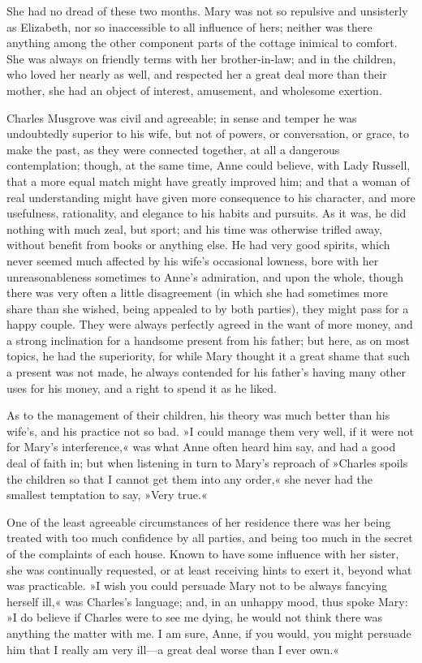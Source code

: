 She had no dread of these two months. Mary was not so repulsive and unsisterly as Elizabeth, nor so inaccessible to all influence of hers; neither was there anything among the other component parts of the cottage inimical to comfort. She was always on friendly terms with her brother-in-law; and in the children, who loved her nearly as well, and respected her a great deal more than their mother, she had an object of interest, amusement, and wholesome exertion.

Charles Musgrove was civil and agreeable; in sense and temper he was undoubtedly superior to his wife, but not of powers, or conversation, or grace, to make the past, as they were connected together, at all a dangerous contemplation; though, at the same time, Anne could believe, with Lady Russell, that a more equal match might have greatly improved him; and that a woman of real understanding might have given more consequence to his character, and more usefulness, rationality, and elegance to his habits and pursuits. As it was, he did nothing with much zeal, but sport; and his time was otherwise trifled away, without benefit from books or anything else. He had very good spirits, which never seemed much affected by his wife's occasional lowness, bore with her unreasonableness sometimes to Anne's admiration, and upon the whole, though there was very often a little disagreement (in which she had sometimes more share than she wished, being appealed to by both parties), they might pass for a happy couple. They were always perfectly agreed in the want of more money, and a strong inclination for a handsome present from his father; but here, as on most topics, he had the superiority, for while Mary thought it a great shame that such a present was not made, he always contended for his father's having many other uses for his money, and a right to spend it as he liked.

As to the management of their children, his theory was much better than his wife's, and his practice not so bad. »I could manage them very well, if it were not for Mary's interference,« was what Anne often heard him say, and had a good deal of faith in; but when listening in turn to Mary's reproach of »Charles spoils the children so that I cannot get them into any order,« she never had the smallest temptation to say, »Very true.«

One of the least agreeable circumstances of her residence there was her being treated with too much confidence by all parties, and being too much in the secret of the complaints of each house. Known to have some influence with her sister, she was continually requested, or at least receiving hints to exert it, beyond what was practicable. »I wish you could persuade Mary not to be always fancying herself ill,« was Charles's language; and, in an unhappy mood, thus spoke Mary: »I do believe if Charles were to see me dying, he would not think there was anything the matter with me. I am sure, Anne, if you would, you might persuade him that I really am very ill—a great deal worse than I ever own.«

